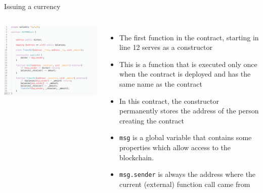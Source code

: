 \documentclass[10pt]{beamer}
\begin{document}
\begin{frame}{Issuing a currency}
	\begin{columns}
	    \includegraphics  [scale=0.3]{Images/contract_new}

	    \begin{itemize}
			\item The first function in the contract, starting in line 12 serves as a constructor
			\item This is a function that is executed only once when the contract is deployed and has the same name as the contract
			\item In this contract, the constructor permanently stores the address of the person creating the contract
			\item \texttt{msg} is a global variable that contains some properties which allow access to the blockchain.
			\item \texttt{msg.sender} is always the address where the current (external) function call came from
	    \end{itemize}
	\end{columns}
\end{frame}

\end{document}
